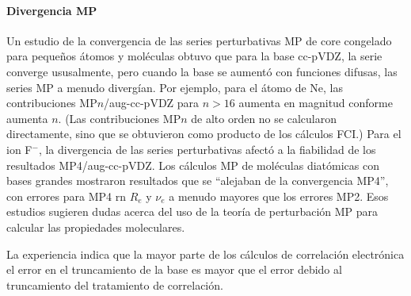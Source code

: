 \paragraph{Divergencia MP}
Un  estudio de la convergencia de las series perturbativas MP de core
congelado para peque\~nos \'atomos y mol\'eculas \citep{Olse1996} 
obtuvo que para la base cc-pVDZ, la serie converge ususalmente, pero
cuando la base se aument\'o con funciones difusas, las series MP a
menudo diverg\'ian. Por ejemplo, para el \'atomo de Ne, las 
contribuciones MP$n$/aug-cc-pVDZ para $n>16$ aumenta en magnitud
conforme aumenta $n$. (Las contribuciones MP$n$ de alto orden no se
calcularon directamente, sino que se obtuvieron como producto de los
c\'alculos FCI.) Para el ion F$^-$, la divergencia de las series
perturbativas afect\'o a la fiabilidad de los resultados 
MP4/aug-cc-pVDZ. Los c\'alculos MP de mol\'eculas diat\'omicas con
bases grandes mostraron resultados que se ``alejaban de la 
convergencia MP4'', con errores para MP4 rn $R_e$ y $\nu_e$ a menudo
mayores que los errores MP2. Esos estudios sugieren dudas acerca del
uso de la teor\'ia de perturbaci\'on MP para calcular las propiedades
moleculares.

La experiencia indica que la mayor parte de los c\'alculos de 
correlaci\'on electr\'onica el error en el truncamiento de la base es
mayor que el error debido al truncamiento del tratamiento de 
correlaci\'on. 

